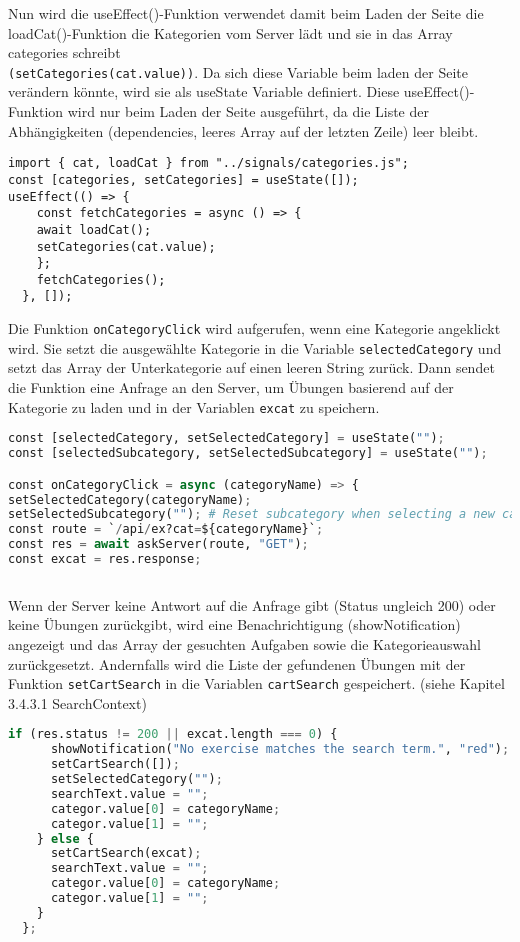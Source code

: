 Nun wird die useEffect()-Funktion verwendet damit beim Laden der Seite die loadCat()-Funktion die Kategorien vom Server lädt und sie in das Array categories schreibt \\\texttt{(setCategories(cat.value))}. Da sich diese Variable beim laden der Seite verändern könnte, wird sie als useState Variable definiert. 
Diese useEffect()-Funktion wird nur beim Laden der Seite ausgeführt, da die Liste der Abhängigkeiten (dependencies, leeres Array auf der letzten Zeile) leer bleibt. 
\\
\begin{lstlisting}
import { cat, loadCat } from "../signals/categories.js";
const [categories, setCategories] = useState([]);
useEffect(() => {
    const fetchCategories = async () => {
    await loadCat();
    setCategories(cat.value);
    };
    fetchCategories();
  }, []);

\end{lstlisting}


Die Funktion \texttt{onCategoryClick} wird aufgerufen, wenn eine Kategorie angeklickt wird. Sie setzt die ausgewählte Kategorie in die Variable \texttt{selectedCategory} und setzt das Array der Unterkategorie auf einen leeren String zurück. Dann sendet die Funktion eine Anfrage an den Server, um Übungen basierend auf der Kategorie zu laden und in der Variablen \texttt{excat} zu speichern.

\begin{lstlisting}[language=Python]
const [selectedCategory, setSelectedCategory] = useState("");
const [selectedSubcategory, setSelectedSubcategory] = useState("");

const onCategoryClick = async (categoryName) => {
setSelectedCategory(categoryName);
setSelectedSubcategory(""); # Reset subcategory when selecting a new category
const route = `/api/ex?cat=${categoryName}`;
const res = await askServer(route, "GET");
const excat = res.response;
    
\end{lstlisting}

 Wenn der Server keine Antwort auf die Anfrage gibt (Status ungleich 200) oder keine Übungen zurückgibt, wird eine Benachrichtigung (showNotification) angezeigt und das Array der gesuchten Aufgaben sowie die Kategorieauswahl zurückgesetzt. Andernfalls wird die Liste der gefundenen Übungen mit der Funktion \texttt{setCartSearch} in die Variablen \texttt{cartSearch} gespeichert. (siehe Kapitel 3.4.3.1 SearchContext)

\newpage
\begin{lstlisting}[language=Python]
    if (res.status != 200 || excat.length === 0) {
      showNotification("No exercise matches the search term.", "red");
      setCartSearch([]);
      setSelectedCategory("");
      searchText.value = "";
      categor.value[0] = categoryName;
      categor.value[1] = "";
    } else {
      setCartSearch(excat);
      searchText.value = "";
      categor.value[0] = categoryName;
      categor.value[1] = "";
    }
  };


\end{lstlisting}



